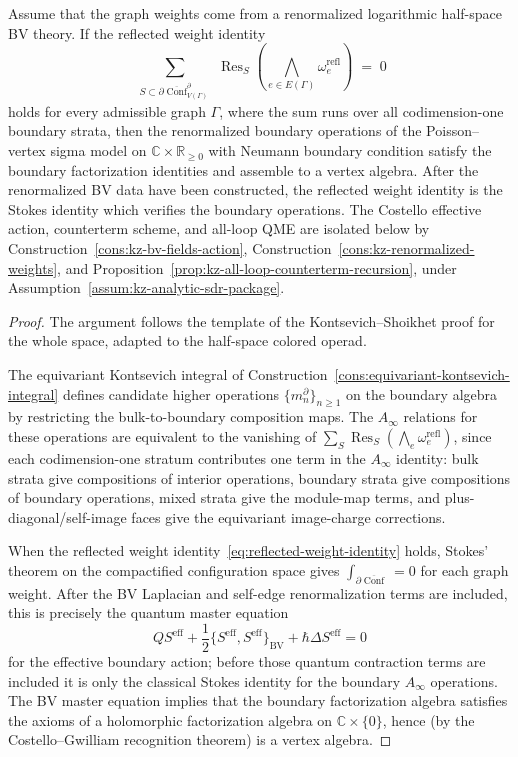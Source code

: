 \begin{theorem}%
\label{thm:half-space-reduction}
Assume that the graph weights come from a renormalized logarithmic
half-space BV theory. If the reflected weight identity
\begin{equation}\label{eq:reflected-weight-identity}
\sum_{\substack{S \subset
\partial\overline{\operatorname{Conf}}^{\partial}_{V(\Gamma)}}} \!\!
\operatorname{Res}_S\!\left(
\bigwedge_{e\in E(\Gamma)} \omega_e^{\mathrm{refl}}\right)
\;=\; 0
\end{equation}
holds for every admissible graph $\Gamma$, where the sum runs over all codimension-one boundary strata, then
the renormalized boundary operations of the Poisson--vertex
sigma model on $\mathbb C\times\mathbb R_{\ge 0}$ with Neumann
boundary condition satisfy the boundary factorization identities and
assemble to a vertex algebra.
After the renormalized BV data have been constructed, the reflected weight
identity is the Stokes identity which verifies the boundary operations.
The Costello effective action,
counterterm scheme, and all-loop QME are isolated below by
Construction~\ref{cons:kz-bv-fields-action},
Construction~\ref{cons:kz-renormalized-weights}, and
Proposition~\ref{prop:kz-all-loop-counterterm-recursion}, under
Assumption~\ref{assum:kz-analytic-sdr-package}.
\end{theorem}

\begin{proof}
The argument follows the template of the Kontsevich--Shoikhet proof for the
whole space, adapted to the half-space colored operad.

The equivariant Kontsevich integral of
Construction~\ref{cons:equivariant-kontsevich-integral} defines candidate
higher operations $\{m_n^{\partial}\}_{n\ge 1}$ on the boundary algebra by
restricting the bulk-to-boundary composition maps. The $A_\infty$ relations
for these operations are equivalent to the vanishing of
$\sum_S \operatorname{Res}_S(\bigwedge_e \omega_e^{\mathrm{refl}})$, since
each codimension-one stratum contributes one term in the $A_\infty$ identity:
bulk strata give compositions of interior operations, boundary strata give
compositions of boundary operations, mixed strata give the module-map terms,
and plus-diagonal/self-image faces give the equivariant image-charge
corrections.

When the reflected weight identity~\eqref{eq:reflected-weight-identity} holds,
Stokes' theorem on the compactified configuration space gives
$\int_{\partial\overline{\operatorname{Conf}}} = 0$
for each graph weight. After the BV Laplacian and self-edge
renormalization terms are included, this is precisely the quantum
master equation
\[
 Q S^{\mathrm{eff}}
 +\frac12\{S^{\mathrm{eff}},S^{\mathrm{eff}}\}_{\mathrm{BV}}
 +\hbar\Delta S^{\mathrm{eff}}=0
\]
for the effective boundary action; before those quantum contraction
terms are included it is only the classical Stokes identity for the
boundary $A_\infty$ operations. The BV master equation implies that the
boundary factorization algebra satisfies the axioms of a holomorphic
factorization algebra on $\mathbb C\times\{0\}$, hence (by the
Costello--Gwilliam recognition theorem) is a vertex algebra.
\end{proof}

